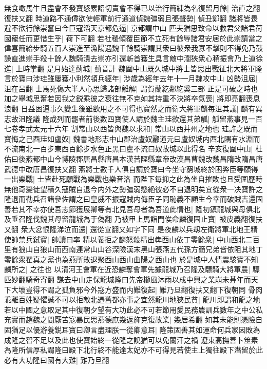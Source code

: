 無食噉馬牛且盡會不發寶怒累詔切責會不得已以治行簡練為名復留月餘|{
	治直之翻復扶又翻}
時道路不通偉欲使輕軍前行通道偵魏彊弱且張聲勢|{
	偵丑鄭翻}
諸將皆畏避不欲行餘崇奮曰今巨寇滔天京都危逼|{
	京都謂中山}
匹夫猶思致命以救君父諸君荷國寵任而更惜生乎|{
	荷下可翻}
若社稷傾覆臣節不立死有餘辱諸君安居於此崇請當之偉喜簡給步騎五百人崇進至漁陽遇魏千餘騎崇謂其衆曰彼衆我寡不擊則不得免乃鼓譟直進崇手殺十餘人魏騎潰去崇亦引還斬首獲生具言敵中濶狹衆心稍振會乃上道徐進|{
	上時掌翻}
是月始達薊城|{
	薊音計}
魏圍中山既久城中將士皆思出戰征北大將軍隆言於寶曰涉珪雖屢獲小利然頓兵經年|{
	涉歲為經年去年十一月魏攻中山}
凶勢沮屈|{
	沮在呂翻}
士馬死傷大半人心思歸諸部離解|{
	謂賀蘭紇鄰紇奚三部}
正是可破之時也加之舉城思奮若因我之鋭乘彼之衰往無不克如其持重不決將卒氣喪|{
	將即亮翻喪息浪翻}
日益困逼事久變生後雖欲用之不可得也寶然之而衛大將軍麟每沮其議|{
	麟有異志故沮隆議}
隆成列而罷者前後數四寶使人請於魏主珪欲還其弟觚|{
	觚留燕事見一百七卷孝武太元十六年}
割常山以西皆與魏以求和|{
	常山以西并州之地也}
珪許之既而寶悔之己酉珪如盧奴|{
	魏書地形志中山郡治盧奴酈道元曰盧奴城内西北隅有水淵而不流南北一百步東西百餘步水色正黑曰盧不流曰奴故城以此得名}
辛亥復圍中山|{
	杜佑曰後燕都中山今博陵郡唐昌縣唐昌本漢苦陘縣章帝改漢昌曹魏改魏昌隋改隋昌唐武德中改唐昌復扶又翻}
燕將士數千人俱自請於寶曰今坐守窮城終於困弊臣等願得一出樂戰|{
	士皆赴死願戰為樂戰也樂音洛}
而陛下每抑之此為坐自摧敗也且受圍歷時無他奇變徒望積久寇賊自退今内外之勢彊弱懸絶彼必不自退明矣宜從衆一决寶許之隆退而勒兵召諸參佐謂之曰皇威不振寇賊内侮臣子同恥義不顧生今幸而破賊吉還固善若其不幸亦使吾志節獲展卿等有北見吾母者為吾道此情也|{
	隆初鎮龍城與母俱北及垂召隆伐魏其母留龍城為于偽翻}
乃被甲上馬詣門俟命麟復固止寶|{
	被皮義翻復扶又翻}
衆大忿恨隆涕泣而還|{
	還從宣翻又如字下同}
是夜麟以兵刼左衛將軍北地王精使帥禁兵弑寶|{
	帥讀曰率}
精以義拒之麟怒殺精出犇西山依丁零餘衆|{
	中山西北二百里有狼山自狼山而西南連常山山谷深險漢末黑山張燕五代孫方簡兄弟皆依阻其地丁零餘衆翟真之黨也為燕所敗退聚西山西山曲陽之西山也}
於是城中人情震駭寶不知麟所之|{
	之往也}
以清河王會軍在近恐麟奪會軍先據龍城乃召隆及驃騎大將軍農|{
	驃匹妙翻騎奇寄翻}
謀去中山走保龍城隆曰先帝櫛風沐雨以成中興之業崩未朞年而天下大壞豈得不謂之孤負邪今外寇方盛而内難復起|{
	難乃旦翻復扶又翻下復朝同}
骨肉乖離百姓疑懼誠不可以拒敵北遷舊都亦事之宜然龍川地狹民貧|{
	龍川即謂和龍之地}
若以中國之意取足其中復朝夕望有大功此必不可若節用愛民務農訓兵數年之中公私充實而趙魏之間厭苦寇暴民思燕德庶幾返斾克復故業|{
	幾居希翻}
如其未能則憑險自固猶足以優游養鋭耳寶曰卿言盡理朕一從卿意耳|{
	隆策固善其如運命何兵家因敗為成隆之智不足以及此也使寶始終一從隆之說猶可以免蘭汗之禍}
遼東高撫善卜筮素為隆所信厚私謂隆曰殿下北行終不能達太妃亦不可得見若使主上獨往殿下潛留於此必有大功隆曰國有大難|{
	難乃旦翻}
